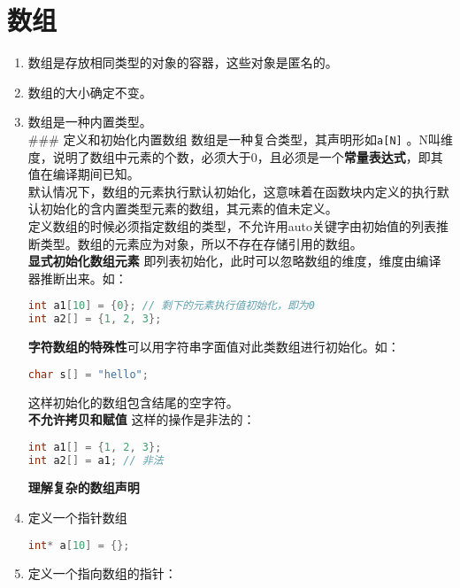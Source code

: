 \documentclass[
  a4paper,
  oneside,tablecaptionabove
]{scrbook}
\begin{document}
\section{数组}\label{ux6570ux7ec4}

\begin{enumerate}
\def\labelenumi{\arabic{enumi}.}
\item
  数组是存放相同类型的对象的容器，这些对象是匿名的。\\
\item
  数组的大小确定不变。\\
\item
  数组是一种内置类型。\\
  \#\#\# 定义和初始化内置数组
  数组是一种复合类型，其声明形如\lstinline!a[N]!
  。N叫维度，说明了数组中元素的个数，必须大于0，且必须是一个\textbf{常量表达式}，即其值在编译期间已知。\\
  默认情况下，数组的元素执行默认初始化，这意味着在函数块内定义的执行默认初始化的含内置类型元素的数组，其元素的值未定义。\\
  定义数组的时候必须指定数组的类型，不允许用auto关键字由初始值的列表推断类型。数组的元素应为对象，所以不存在存储引用的数组。\\
  \textbf{显式初始化数组元素}
  即列表初始化，此时可以忽略数组的维度，维度由编译器推断出来。如：

\begin{lstlisting}[language={C++}]
int a1[10] = {0}; // 剩下的元素执行值初始化，即为0
int a2[] = {1, 2, 3};
\end{lstlisting}

  \textbf{字符数组的特殊性}可以用字符串字面值对此类数组进行初始化。如：

\begin{lstlisting}[language={C++}]
char s[] = "hello";
\end{lstlisting}

  这样初始化的数组包含结尾的空字符。\\
  \textbf{不允许拷贝和赋值} 这样的操作是非法的：

\begin{lstlisting}[language={C++}]
int a1[] = {1, 2, 3};
int a2[] = a1; // 非法
\end{lstlisting}

  \textbf{理解复杂的数组声明}\\
\item
  定义一个指针数组

\begin{lstlisting}[language={C++}]
int* a[10] = {};
\end{lstlisting}
\item
  定义一个指向数组的指针：


\end{enumerate}
\end{document}
